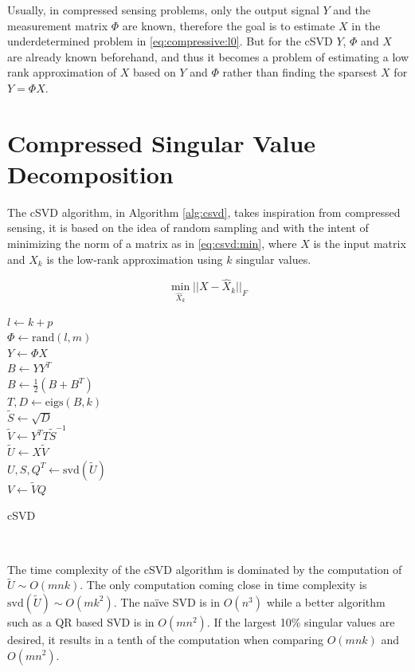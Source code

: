 Usually, in compressed sensing problems, only the output signal $Y$ and the measurement matrix $\Phi$ are known, therefore the goal is to estimate $X$ in the underdetermined problem in \eqref{eq:compressive:l0}. But for the cSVD $Y$, $\Phi$ and $X$ are already known beforehand, and thus it becomes a problem of estimating a low rank approximation of $X$ based on $Y$ and $\Phi$ rather than finding the sparsest $X$ for $Y = \Phi X$.

\section{Compressed Singular Value Decomposition}

The cSVD algorithm, in Algorithm \ref{alg:csvd}, takes inspiration from compressed sensing, it is based on the idea of random sampling and with the intent of minimizing the norm of a matrix as in \eqref{eq:csvd:min}, where $X$ is the input matrix and $X_k$ is the low-rank approximation using $k$ singular values.

\begin{equation}
  \label{eq:csvd:min}
  \min_{\hat X_k} || X - \hat X_k ||_F
\end{equation}

\begin{algorithm}[H]
  \label{alg:csvd}
\SetAlgoLined
{}
$l \gets k + p$ \\
$\Phi \gets \mathrm{rand}(l, m)$ \\
$Y \gets \Phi X$ \\
$B \gets Y Y^T$ \\
$B \gets \frac{1}{2}(B + B^T)$ \\
$T,D \gets \mathrm{eigs}(B,k)$ \\
$\tilde S \gets \sqrt{D}$ \\
$\tilde V \gets Y^T T \tilde S^{-1}$ \\
$\tilde U \gets X \tilde V$ \\
$U,S,Q^T \gets \mathrm{svd}(\tilde U)$ \\
$V \gets \tilde V Q$ \\
\caption{cSVD}
\end{algorithm}

$ $ \newline

The time complexity of the cSVD algorithm is dominated by the computation of $\tilde U \sim O(mnk)$. The only computation coming close in time complexity is $\mathrm{svd}(\tilde U) \sim O(mk^2)$. The naïve SVD is in $O(n^3)$ while a better algorithm such as a QR based SVD is in $O(mn^2)$. If the largest 10\% singular values are desired, it results in a tenth of the computation when comparing $O(mnk)$ and $O(mn^2)$.

